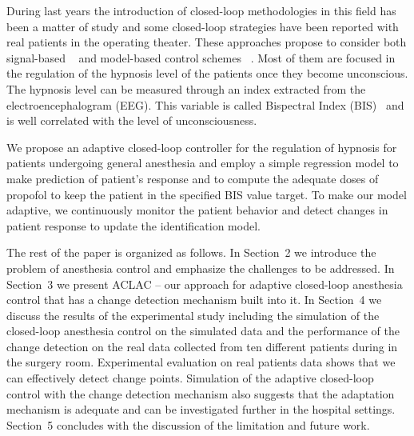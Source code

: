 During last years the introduction of closed-loop methodologies in
this field has been a matter of study and some closed-loop strategies
have been reported with real patients in the operating theater. These
approaches propose to consider both signal-based
~\cite{mendez_adaptive_2009,reboso_design_2012} and model-based
control schemes ~\cite{liu_closed_loop_2011, nino_epsac_controlled_2009}.
%
Most of them are focused in the regulation of the hypnosis level of
the patients once they become unconscious.
%
The hypnosis level can be measured through an index extracted
from the electroencephalogram (EEG). This variable is called
Bispectral Index (BIS)~\cite{bis} and is well correlated with the
level of unconsciousness. %

We propose an adaptive closed-loop controller for the regulation of
hypnosis for patients undergoing general anesthesia and
employ a simple regression model to make prediction of patient's
response and to compute the adequate doses of propofol to keep the
patient in the specified BIS value target.
%
To make our model adaptive, we continuously monitor the patient
behavior and detect changes in patient response to update the
identification model.

The rest of the paper is organized as follows.
In Section~2 we introduce the problem of anesthesia control and emphasize the challenges to be addressed.
%
In Section~3 we present ACLAC -- our approach for adaptive closed-loop
anesthesia control that has a change detection mechanism built into
it. In Section~4 we discuss the results of the experimental study
including the simulation of the closed-loop anesthesia control on the
simulated data and the performance of the change detection on the real
data collected from ten different patients during in the surgery room.
Experimental evaluation on real patients data shows that we can
effectively detect change points. Simulation of the adaptive
closed-loop control with the change detection mechanism also suggests
that the adaptation mechanism is adequate and can be investigated
further in the hospital settings. Section~5 concludes with the
discussion of the limitation and future work.

